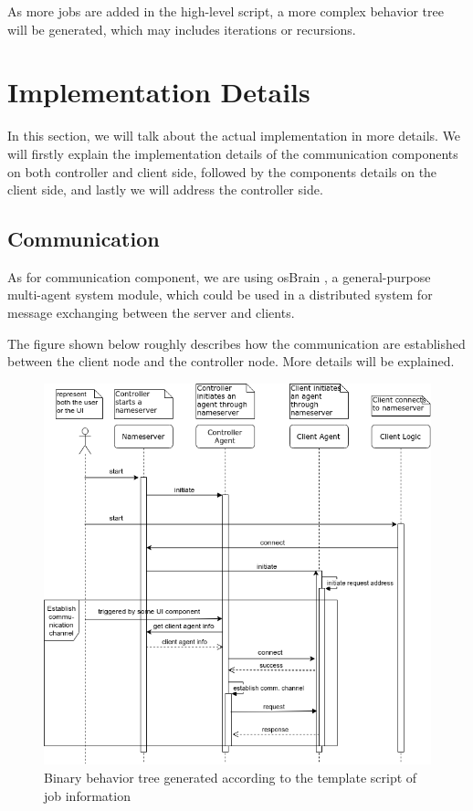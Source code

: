 \documentclass[12pt]{report}
\begin{document}
As more jobs are added in the high-level script, a more complex behavior tree will be generated, which may includes iterations or recursions.

\section{Implementation Details}

In this section, we will talk about the actual implementation in more details. We will firstly explain the implementation details of the communication components on both controller and client side, followed by the components details on the client side, and lastly we will address the controller side.

\subsection{Communication}

As for communication component, we are using osBrain \citep{osBrain}, a general-purpose multi-agent system module, which could be used in a distributed system for message exchanging between the server and clients.

The figure shown below roughly describes how the communication are established between the client node and the controller node. More details will be explained.

\begin{figure}[h!]
	\centering
	\includegraphics[width=1\textwidth]{./pictures/comm-uml}
	\caption{Binary behavior tree generated according to the template script of job information}
\end{figure}
\end{document}
